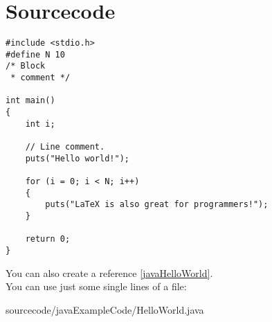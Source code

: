 \chapter{Sourcecode}


\begin{lstlisting}
#include <stdio.h>
#define N 10
/* Block
 * comment */

int main()
{
	int i;
	
	// Line comment.
	puts("Hello world!");
	
	for (i = 0; i < N; i++)
	{
		puts("LaTeX is also great for programmers!");
	}

	return 0;
}
\end{lstlisting}



You can also create a reference \ref{javaHelloWorld}.\\

You can use just some single lines of a file:


	{sourcecode/javaExampleCode/HelloWorld.java}